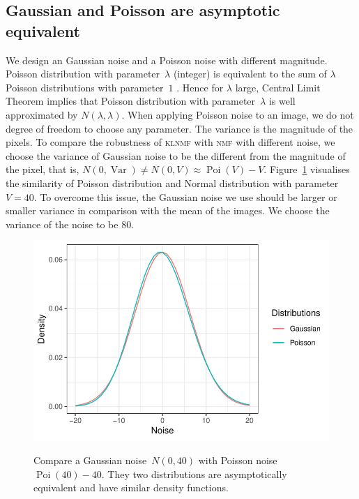 \subsection{Gaussian and Poisson are asymptotic equivalent}
 We design an Gaussian noise and a Poisson noise with different magnitude.
 Poisson distribution with parameter~$\lambda$ (integer) is equivalent to the sum of $\lambda$ Poisson distributions with parameter~$1$ \citep[][p. 45]{Walck:1996cca}.
 Hence for $\lambda$ large, Central Limit Theorem implies that Poisson distribution with parameter~$\lambda$ is well approximated by $N(\lambda,\lambda)$.
 When applying Poisson noise to an image, we do not degree of freedom to choose any parameter.
 The variance is the magnitude of the pixels. To compare the robustness of \textsc{klnmf} with \textsc{nmf} with different noise, we choose the variance of Gaussian noise to be the different from the magnitude of the pixel, that is, $N(0,\operatorname{Var})\neq N(0,V)\approx \operatorname{Poi}(V)-V$.
 Figure~\ref{noise} visualises the similarity of Poisson distribution and Normal distribution with parameter~$V=40$. To overcome this issue, the Gaussian noise we use should be larger or smaller variance in comparison with the mean of the images. We choose the variance of the noise to be $80$.
\begin{figure}
  \centering
  \includegraphics[scale=1]{resource/noise}\\
  \caption{Compare a Gaussian noise~$N(0,40)$ with Poisson noise $\operatorname{Poi}(40)-40$. They two distributions are asymptotically equivalent and have similar density functions.}\label{noise}
\end{figure}

